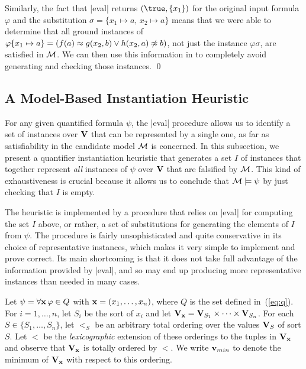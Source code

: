 \documentclass{svjour3}                     %
\begin{document}
\begin{example}
Similarly, the fact that |eval| returns $(\true, \{ x_1 \} )$ 
for the original input formula $\varphi$ and 
the substitution $\sigma = \{ x_1 \mapsto a,\, x_2 \mapsto a \}$
means that we were able to determine that 
all ground instances of 
$\varphi\{x_1 \mapsto a \} = (f(a) \approx g(x_2,b) \lor h(x_2,a) \not\approx b)$,
not just the instance $\varphi\sigma$, are satisfied in $\mathcal{M}$.
We can then use this information in \fmsolve to completely avoid 
generating and checking those instances.
\qed
\end{example}

\subsection{A Model-Based Instantiation Heuristic}
For any given quantified formula $\psi$,
the |eval| procedure allows us to identify a set of instances over $\mathbf{V}$
that can be represented by a single one, 
as far as satisfiability in the candidate model $\mathcal{M}$ is concerned.
In this subsection, we present a quantifier instantiation heuristic
that generates a set $I$ of instances
that together represent \emph{all} instances of $\psi$ over $\mathbf{V}$
that are falsified by $\mathcal{M}$.
This kind of exhaustiveness is crucial because it allows us to conclude
that $\mathcal{M} \models \psi$ by just checking that $I$ is empty.

The heuristic is implemented by a procedure that relies on |eval| for computing 
the set $I$ above, or rather, a set of substitutions for generating the elements 
of $I$ from $\psi$.
The procedure is fairly unsophisticated and quite conservative 
in its choice of representative instances,
which makes it very simple to implement and prove correct.
Its main shortcoming is that it does not take full advantage of the information 
provided by |eval|, and 
so may end up producing more representative instances than needed in many cases.

Let $\psi = \forall \mathbf{x}\, \varphi \in Q$
with $\mathbf{x} = (x_1, \ldots, x_n)$,
where $Q$ is the set defined in~(\ref{eq:q}).
For $i=1,\ldots,n$, let $S_i$ be the sort of $x_i$ and let
$\mathbf{V}_{\mathbf{x}} = \mathbf{V}_{S_1} \times \cdots \times \mathbf{V}_{S_n}$.
For each $S \in \{S_1, \ldots, S_n\}$,
let $<_S$ be an arbitrary total ordering over the values $\mathbf{V}_S$ of sort $S$.
Let $<$ be the \emph{lexicographic}
extension of these orderings to the tuples 
in $\mathbf{V}_{\mathbf{x}}$ and observe that $\mathbf{V}_{\mathbf{x}}$ is totally ordered by $<$.
We write ${\mathbf{v}}_{min}$ to denote the minimum of $\mathbf{V}_{\mathbf{x}}$ with respect to this ordering.
\end{document}

